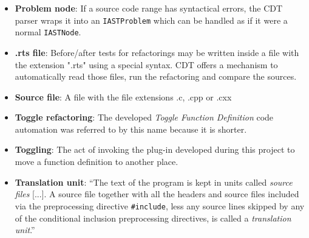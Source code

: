 \begin{itemize}
\item \textbf{Problem node}: If a source code range has syntactical errors, 
the CDT parser wraps it into an \texttt{IASTProblem} which can be handled as if 
it were a normal \texttt{IASTNode}.

\item \textbf{.rts file}: Before/after tests for refactorings may be written 
inside a file with the extension ".rts" using a special syntax. CDT offers a 
mechanism to automatically read those files, run the refactoring and compare the 
sources.

\item \textbf{Source file}: A file with the file extensions .c, .cpp or .cxx

\item \textbf{Toggle refactoring}: The developed \textit{Toggle Function 
Definition} code automation was referred to by this name because it is shorter.

\item \textbf{Toggling}: The act of invoking the plug-in developed during this 
project to move a function definition to another place.

\item \textbf{Translation unit}: ``The text of the program is kept in units 
called \textit{source files} [...]. A source file together with all the headers and 
source files included via the preprocessing directive \texttt{\#include}, less 
any source lines skipped by any of the conditional inclusion preprocessing 
directives, is called a \textit{translation unit}.''\cite{IsoCpp}
\end{itemize}

